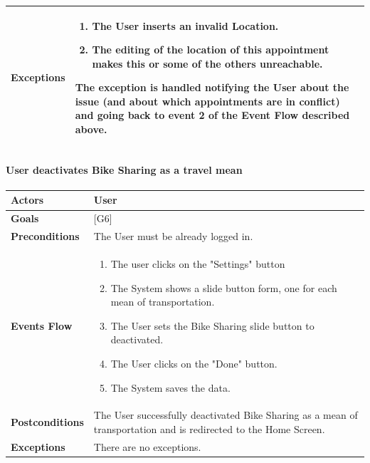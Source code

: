 \documentclass[12pt]{article}
\begin{document}
\begin{center}
\begin{tabular} { |p{}|p{}| }
        \hline
        \textbf{Exceptions} & \begin{enumerate}[topsep=0pt] 
                            \setlength{\itemsep}{0.5pt}
                            \item The User inserts an invalid Location.
                            \item The editing of the location of this appointment makes this or some of the others unreachable.
                            \end{enumerate} 
                            The exception is handled notifying the User about the issue (and about which appointments are in conflict) and going back to event 2 of the Event Flow described above.\\ 
        \hline
    \end{tabular}
\end{center}

\newpage

\paragraph{User deactivates Bike Sharing as a travel mean}
\begin{center}
    \begin{tabular} { |p{}|p{}| }
        \hline
        \textbf{Actors} & User \\ 
        \hline
        \textbf{Goals} & {[G6]} \\ 
        \hline  
        \textbf{Preconditions} & The User must be already logged in. \\ 
        \hline
        \textbf{Events Flow} & \begin{enumerate}[topsep=0pt] 
                            \setlength{\itemsep}{0.5pt}
                            \item The user clicks on the "Settings" button
                            \item The System shows a slide button form, one for each mean of transportation.
                            \item The User sets the Bike Sharing slide button to deactivated.
                            \item The User clicks on the "Done" button.
                            \item The System saves the data.
                            \end{enumerate} \\
        \hline
        \textbf{Postconditions} & The User successfully deactivated Bike Sharing as a mean of transportation and is redirected to the Home Screen. \\
        \hline
        \textbf{Exceptions} & There are no exceptions.\\ 
        \hline
     \end{tabular}
\end{center}
\end{document}

